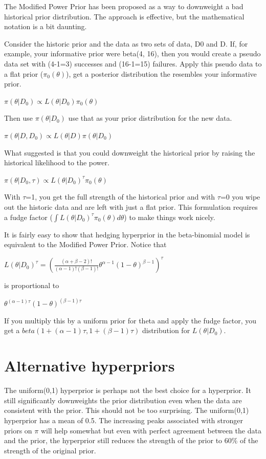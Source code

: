 \documentclass[12pt]{article}
\begin{document}
The Modified Power Prior has been proposed as a way to downweight a bad historical prior distribution. The approach is effective, but the mathematical notation is a bit daunting.

Consider the historic prior and the data as two sets of data, D0 and D. If, for example, your informative prior were  beta(4, 16), then you would create a pseudo data set with (4-1=3) successes and (16-1=15) failures. Apply this pseudo data to a flat prior ($\pi_0(\theta)$), get a posterior distribution the resembles your informative prior.

$\pi(\theta | D_0) \propto L(\theta|D_0)\pi_0(\theta)$ 

Then use $\pi(\theta | D_0)$ use that as your prior distribution for the new data.

$\pi(\theta | D,D_0) \propto L(\theta|D)\pi(\theta | D_0)$  

What \cite{ibrahim03} suggested is that you could downweight the historical prior by raising the historical likelihood to the power.

$\pi(\theta | D_0, \tau) \propto L(\theta|D_0)^{\tau}\pi_0(\theta)$

With $\tau$=1, you get the full strength of the historical prior and with $\tau$=0 you wipe out the historic data and are left with just a flat prior. This formulation requires a fudge factor ($\int L(\theta|D_0)^{\tau}\pi_0(\theta)d\theta$) to make things work nicely.

It is fairly easy to show that hedging hyperprior in the beta-binomial model is equivalent to the Modified Power Prior. Notice that

$L(\theta|D_0)^{\tau}=\left(\frac{(\alpha+\beta-2)!}{(\alpha-1)!(\beta-1)!}\theta^{\alpha-1}(1-\theta)^{\beta-1}\right)^\tau$

is proportional to

$\theta^{(\alpha-1)\tau}(1-\theta)^{(\beta-1)\tau}$

If you multiply this by a uniform prior for theta and apply the fudge factor, you get a $beta(1+(\alpha-1)\tau,1+(\beta-1)\tau)$ distribution for $L(\theta|D_0)$.

\section{Alternative hyperpriors}
\label{sec:pr}

The uniform(0,1) hyperprior is perhaps not the best choice for a hyperprior. It still significantly downweights the prior distribution even when the data are consistent with the prior. This should not be too surprising. The uniform(0,1) hyperprior has a mean of 0.5. The increasing peaks associated with stronger priors on $\pi$ will help somewhat but even with perfect agreement between the data and the prior, the hyperprior still reduces the strength of the prior to 60\% of the strength of the original prior.
\end{document}
